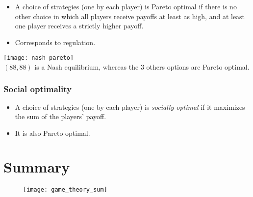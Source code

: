 \begin{itemize}
\item A choice of strategies (one by each player) is Pareto optimal if there is no other choice in which all players receive payoffs at least as high, and at least one player receives a strictly higher payoff.
\item Corresponds to regulation.
\end{itemize}

\begin{table}[H]
    \centering
    \texttt{[image: nash\_pareto]}\\
    $(88, 88)$ is a Nash equilibrium, whereas the 3 others options are Pareto optimal.
\end{table}

\subsubsection{Social optimality}

\begin{itemize}
\item A choice of strategies (one by each player) is \textit{socially optimal} if it maximizes the sum of the players' payoff.
\item It is also Pareto optimal.
\end{itemize}

\section{Summary}

\begin{figure}[H]
    \centering
    \texttt{[image: game\_theory\_sum]}
\end{figure}


